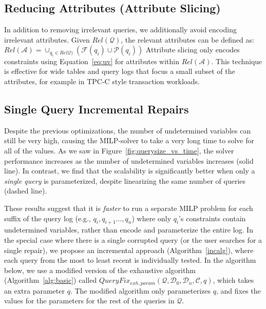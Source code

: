 \subsection{Reducing Attributes (Attribute Slicing)}

In addition to removing irrelevant queries, we additionally avoid encoding irrelevant attributes.
Given $Rel\mathcal{(Q)}$, the relevant attributes can be defined as:
$Rel\mathcal{(A)} = \cup_{q_i \in Rel\mathcal{Q)}} (\mathcal{F}(q_i)\cup \mathcal{P}(q_i))$
Attribute slicing only encodes constraints using Equation~\ref{eq:uv} for attributes within $Rel\mathcal{(A)}$.
This technique is effective for wide tables and query logs that focus a small subset of the attributes, for example
in TPC-C style transaction workloads.



\subsection{Single Query Incremental Repairs}

Despite the previous optimizations, the number of undetermined variables can still be very high, causing 
the MILP-solver to take a very long time to solve for all of the values.  As we saw in
Figure~\ref{fig:querysize_vs_time}, the solver performance increases 
as the number of undetermined variables increases (solid line).
In contrast, we find that the scalability is significantly better when only a {\it single query}
is parameterized, despite linearizing the same number of queries (dashed line).

These results suggest that it is {\it faster} to run a separate MILP problem for each 
suffix of the query log (e.g., $q_i, q_{i+1}\ldots, q_n$) where only $q_i$'s constraints contain
undetermined variables, rather than encode and parameterize the entire log.
In the special case where there is a single corrupted query (or the user searches for a single repair),
we propose an incremental approach (Algorithm~\ref{incalg}), 
where each query from the most to least recent is individually tested.
In the algorithm below, we use a modified version of the exhaustive algorithm 
(Algorithm~\ref{alg:basic}) called $QueryFix_{exh,param}(\mathcal{Q}, \mathcal{D}_0, \mathcal{D}_n, \mathcal{C}, q)$,
which takes an extra parameter $q$.  The modified algorithm only parameterizes $q$, 
and fixes the values for the parameters for the rest of the queries in $\mathcal{Q}$.

